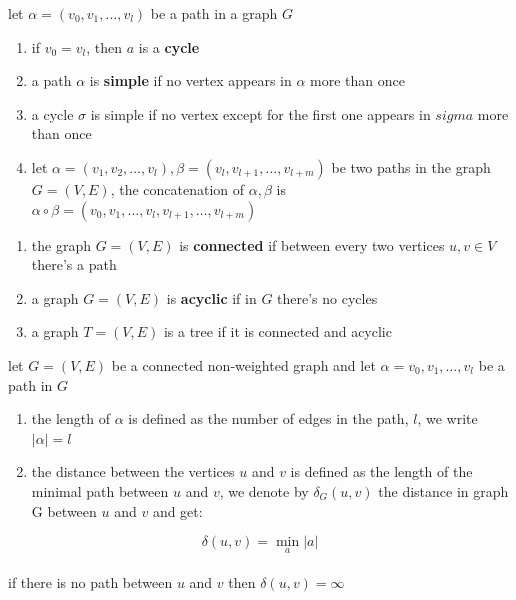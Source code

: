 \documentclass[a4paper,12pt]{article}
\begin{document}
\begin{definition}
let \(\alpha=(v_0,v_1,\dots,v_l)\) be a path in a graph \(G\)\\
\begin{enumerate}
\item if \(v_0=v_l\), then \(a\) is a \textbf{cycle}\\
\item a path \(\alpha\) is \textbf{simple} if no vertex appears in \(\alpha\) more than once\\
\item a cycle \(\sigma\) is simple if no vertex except for the first one appears in \(sigma\) more than once\\
\item let \(\alpha=(v_1,v_2,\dots,v_l),\beta=(v_l,v_{l+1},\dots,v_{l+m})\) be two paths in the graph \(G=(V,E)\), the concatenation of \(\alpha,\beta\) is \(\alpha \circ \beta = (v_0,v_1,\dots,v_l,v_{l+1},\dots,v_{l+m})\)\\
\end{enumerate}
\end{definition}
\begin{definition}
\begin{enumerate}
\item the graph \(G=(V,E)\) is \textbf{connected} if between every two vertices \(u,v \in V\) there's a path\\
\item a graph \(G=(V,E)\) is \textbf{acyclic} if in \(G\) there's no cycles\\
\item a graph \(T=(V,E)\) is a tree if it is connected and acyclic\\
\end{enumerate}
\end{definition}
\begin{definition}
let \(G=(V,E)\) be a connected non-weighted graph and let \(\alpha=v_0,v_1,\dots,v_l\) be a path in \(G\)\\
\begin{enumerate}
\item the length of \(\alpha\) is defined as the number of edges in the path, \(l\), we write \(|\alpha|=l\)\\
\item the distance between the vertices \(u\) and \(v\) is defined as the length of the minimal path between \(u\) and \(v\), we denote by \(\delta_G(u,v)\) the distance in graph G between \(u\) and \(v\) and get:\\
\end{enumerate}
\[
\delta(u,v) = \min_a |a|
\]\\
if there is no path between \(u\) and \(v\) then \(\delta(u,v)=\infty\)\\
\end{definition}
\end{document}
